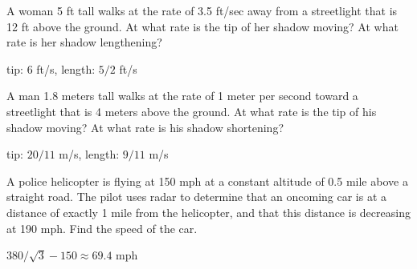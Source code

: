 \begin{exercises}

\begin{exercise}
A woman 5 ft tall walks at the rate of 3.5 ft/sec away from a streetlight
that is 12 ft above the ground.  At what rate is the tip of her shadow
moving?  At what rate is her shadow lengthening?
\begin{answer} tip: 6 ft/s, length: $5/2$ ft/s
\end{answer}\end{exercise}

\begin{exercise} A man 1.8 meters tall walks at the rate of 1 meter per
second toward a streetlight that is 4 meters above the ground.  At
what rate is the tip of his shadow moving?  At what rate is his shadow
shortening?
\begin{answer} tip: $20/11$ m/s, length: $9/11$ m/s
\end{answer}\end{exercise}

\begin{exercise}
A police helicopter is flying at 150 mph at a constant altitude of 0.5 mile
above a straight road.  The pilot uses radar to determine that an oncoming
car is at a distance of exactly 1 mile from the helicopter, and that this
distance is decreasing at 190 mph.  Find the speed of the car.
\begin{answer} $380/\sqrt3-150\approx 69.4$ mph
\end{answer}\end{exercise}


\end{exercises}
